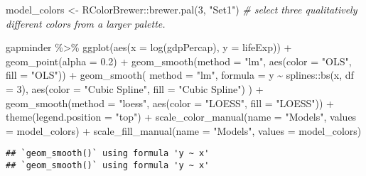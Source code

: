 \documentclass[
]{book}
\newenvironment{Shaded}{\begin{snugshade}}{\end{snugshade}}
\newcommand{\AttributeTok}[1]{\textcolor[rgb]{0.77,0.63,0.00}{#1}}
\newcommand{\CommentTok}[1]{\textcolor[rgb]{0.56,0.35,0.01}{\textit{#1}}}
\newcommand{\DecValTok}[1]{\textcolor[rgb]{0.00,0.00,0.81}{#1}}
\newcommand{\FloatTok}[1]{\textcolor[rgb]{0.00,0.00,0.81}{#1}}
\newcommand{\FunctionTok}[1]{\textcolor[rgb]{0.00,0.00,0.00}{#1}}
\newcommand{\NormalTok}[1]{#1}
\newcommand{\OtherTok}[1]{\textcolor[rgb]{0.56,0.35,0.01}{#1}}
\newcommand{\SpecialCharTok}[1]{\textcolor[rgb]{0.00,0.00,0.00}{#1}}
\newcommand{\StringTok}[1]{\textcolor[rgb]{0.31,0.60,0.02}{#1}}
\begin{document}
\begin{Shaded}
\begin{Highlighting}[]
\NormalTok{model\_colors }\OtherTok{\textless{}{-}}\NormalTok{ RColorBrewer}\SpecialCharTok{::}\FunctionTok{brewer.pal}\NormalTok{(}\DecValTok{3}\NormalTok{, }\StringTok{"Set1"}\NormalTok{) }\CommentTok{\# select three qualitatively different colors from a larger palette.}

\NormalTok{gapminder }\SpecialCharTok{\%\textgreater{}\%}
  \FunctionTok{ggplot}\NormalTok{(}\FunctionTok{aes}\NormalTok{(}\AttributeTok{x =} \FunctionTok{log}\NormalTok{(gdpPercap), }\AttributeTok{y =}\NormalTok{ lifeExp)) }\SpecialCharTok{+}
  \FunctionTok{geom\_point}\NormalTok{(}\AttributeTok{alpha =} \FloatTok{0.2}\NormalTok{) }\SpecialCharTok{+}
  \FunctionTok{geom\_smooth}\NormalTok{(}\AttributeTok{method =} \StringTok{"lm"}\NormalTok{, }\FunctionTok{aes}\NormalTok{(}\AttributeTok{color =} \StringTok{"OLS"}\NormalTok{, }\AttributeTok{fill =} \StringTok{"OLS"}\NormalTok{)) }\SpecialCharTok{+}
  \FunctionTok{geom\_smooth}\NormalTok{(}
    \AttributeTok{method =} \StringTok{"lm"}\NormalTok{, }\AttributeTok{formula =}\NormalTok{ y }\SpecialCharTok{\textasciitilde{}}\NormalTok{ splines}\SpecialCharTok{::}\FunctionTok{bs}\NormalTok{(x, }\AttributeTok{df =} \DecValTok{3}\NormalTok{),}
    \FunctionTok{aes}\NormalTok{(}\AttributeTok{color =} \StringTok{"Cubic Spline"}\NormalTok{, }\AttributeTok{fill =} \StringTok{"Cubic Spline"}\NormalTok{)}
\NormalTok{  ) }\SpecialCharTok{+}
  \FunctionTok{geom\_smooth}\NormalTok{(}\AttributeTok{method =} \StringTok{"loess"}\NormalTok{, }\FunctionTok{aes}\NormalTok{(}\AttributeTok{color =} \StringTok{"LOESS"}\NormalTok{, }\AttributeTok{fill =} \StringTok{"LOESS"}\NormalTok{)) }\SpecialCharTok{+}
  \FunctionTok{theme}\NormalTok{(}\AttributeTok{legend.position =} \StringTok{"top"}\NormalTok{) }\SpecialCharTok{+}
  \FunctionTok{scale\_color\_manual}\NormalTok{(}\AttributeTok{name =} \StringTok{"Models"}\NormalTok{, }\AttributeTok{values =}\NormalTok{ model\_colors) }\SpecialCharTok{+}
  \FunctionTok{scale\_fill\_manual}\NormalTok{(}\AttributeTok{name =} \StringTok{"Models"}\NormalTok{, }\AttributeTok{values =}\NormalTok{ model\_colors)}
\end{Highlighting}
\end{Shaded}

\begin{verbatim}
## `geom_smooth()` using formula 'y ~ x'
## `geom_smooth()` using formula 'y ~ x'
\end{verbatim}
\end{document}

